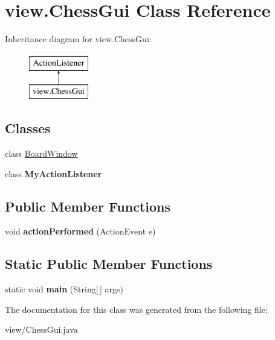 \hypertarget{classview_1_1ChessGui}{\section{view.\-Chess\-Gui Class Reference}
\label{classview_1_1ChessGui}
}
Inheritance diagram for view.\-Chess\-Gui\-:\begin{figure}[H]
\begin{center}
\leavevmode
\includegraphics[height=2.000000cm]{classview_1_1ChessGui}
\end{center}
\end{figure}
\subsection*{Classes}
\begin{DoxyCompactItemize}
\item 
class \hyperlink{classview_1_1ChessGui_1_1BoardWindow}{Board\-Window}
\item 
class {\bfseries My\-Action\-Listener}
\end{DoxyCompactItemize}
\subsection*{Public Member Functions}
\begin{DoxyCompactItemize}
\item 
\hypertarget{classview_1_1ChessGui_aa50c2d1a70a911eb1eb34edd39248d0f}{void {\bfseries action\-Performed} (Action\-Event e)}\label{classview_1_1ChessGui_aa50c2d1a70a911eb1eb34edd39248d0f}

\end{DoxyCompactItemize}
\subsection*{Static Public Member Functions}
\begin{DoxyCompactItemize}
\item 
\hypertarget{classview_1_1ChessGui_a8043eb548c095e1455b38c499d221458}{static void {\bfseries main} (String\mbox{[}$\,$\mbox{]} args)}\label{classview_1_1ChessGui_a8043eb548c095e1455b38c499d221458}

\end{DoxyCompactItemize}


The documentation for this class was generated from the following file\-:\begin{DoxyCompactItemize}
\item 
view/Chess\-Gui.\-java\end{DoxyCompactItemize}
